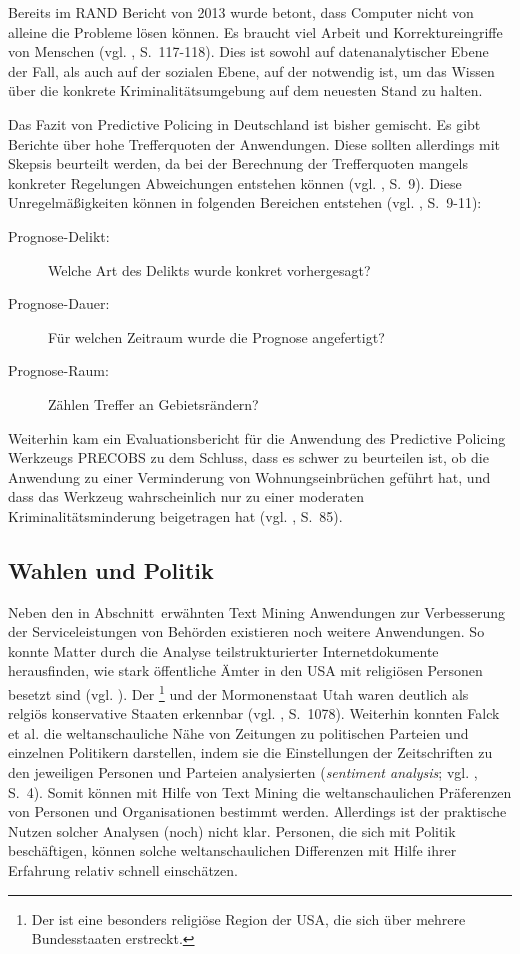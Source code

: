 Bereits im RAND Bericht von 2013 wurde betont, dass Computer nicht von alleine die Probleme
lösen können. Es braucht viel Arbeit und Korrektureingriffe von Menschen (vgl. \cite{Perry}, S.~117-118). 
Dies ist sowohl auf datenanalytischer Ebene der Fall, als auch auf der sozialen Ebene, auf der
\grqq{} notwendig ist, um das Wissen über die konkrete Kriminalitätsumgebung auf dem
neuesten Stand zu halten. 

Das Fazit von Predictive Policing in Deutschland ist bisher gemischt. Es gibt Berichte über hohe
Trefferquoten der Anwendungen. Diese sollten allerdings mit Skepsis beurteilt
werden, da bei der Berechnung der Trefferquoten mangels konkreter Regelungen Abweichungen
entstehen können (vgl. \cite{Bode}, S.~9).
Diese Unregelmäßigkeiten können in folgenden Bereichen entstehen (vgl. \cite{Bode}, S.~9-11):

\begin{description}
\item[Prognose-Delikt:] Welche Art des Delikts wurde konkret vorhergesagt?
\item[Prognose-Dauer:] Für welchen Zeitraum wurde die Prognose angefertigt?
\item[Prognose-Raum:] Zählen Treffer an Gebietsrändern?
\end{description}

Weiterhin kam ein Evaluationsbericht für die Anwendung des Predictive Policing Werkzeugs PRECOBS
zu dem Schluss, dass es schwer zu beurteilen ist, ob die Anwendung zu einer Verminderung von
Wohnungseinbrüchen geführt hat, und dass das Werkzeug wahrscheinlich nur zu einer moderaten Kriminalitätsminderung
beigetragen hat (vgl. \cite{Gerstner}, S.~85).  

\subsection{Wahlen und Politik}

Neben den in Abschnitt~\xcom erwähnten Text Mining Anwendungen zur Verbesserung der Serviceleistungen
von Behörden existieren noch weitere \grqq{} Anwendungen. So konnte Matter durch
die Analyse teilstrukturierter Internetdokumente herausfinden, wie stark öffentliche Ämter in den USA
mit religiösen Personen besetzt sind (vgl. \cite{Matter}). Der \grqq{}\footnote{
Der \grqq{} ist eine besonders religiöse Region der USA, die sich über mehrere Bundesstaaten erstreckt.
} und der Mormonenstaat Utah waren deutlich als relgiös konservative Staaten erkennbar (vgl. \cite{Matter}, S.~1078).
Weiterhin konnten Falck et al. die weltanschauliche Nähe von Zeitungen zu politischen Parteien und einzelnen Politikern
darstellen, indem sie die Einstellungen der Zeitschriften zu den jeweiligen Personen und Parteien analysierten
(\emph{sentiment analysis}; vgl. \cite{Falck}, S.~4). Somit können mit Hilfe von Text Mining die weltanschaulichen Präferenzen
von Personen und Organisationen bestimmt werden. Allerdings ist der praktische Nutzen solcher Analysen (noch) nicht klar.
Personen, die sich mit Politik beschäftigen, können solche weltanschaulichen Differenzen mit Hilfe ihrer Erfahrung relativ
schnell einschätzen.

